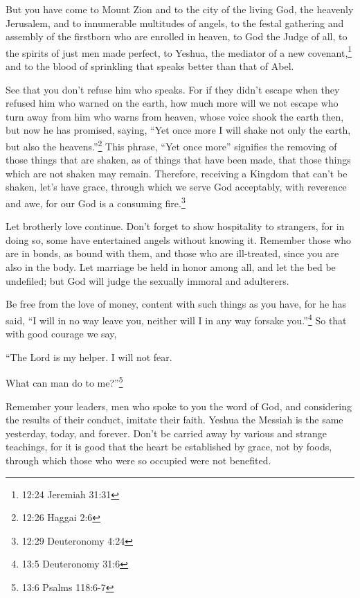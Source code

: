 \myverse{}But you have come to Mount Zion and to the city of the living
God, the heavenly Jerusalem, and to innumerable multitudes of angels,
\myverse{}to the festal gathering and assembly of the firstborn who are enrolled in
heaven, to God the Judge of all, to the spirits of just men made perfect,
\myverse{}to Yeshua, the mediator of a new covenant,\footnote{12:24 Jeremiah 31:31} and to the blood of sprinkling that speaks
better than that of Abel.

\myverse{}See that you don’t refuse him who speaks. For if they didn’t
escape when they refused him who warned on the earth, how much more will we not escape who turn away from
him who warns from heaven,
\myverse{}whose voice shook the earth then, but now he has promised, saying, “Yet once
more I will shake not only the earth, but also the heavens.”\footnote{12:26 Haggai 2:6}
\myverse{}This phrase, “Yet once more” signifies the removing of those things that
are shaken, as of things that have been made, that those things which are not shaken may remain.
\myverse{}Therefore, receiving a Kingdom that can’t be shaken, let’s have grace, through
which we serve God acceptably, with reverence and awe,
\myverse{}for our God is a consuming fire.\footnote{12:29 Deuteronomy 4:24}


\mychapter{} \myverse*{}Let brotherly love continue.
\myverse{}Don’t forget to show hospitality to strangers, for in doing so, some have entertained
angels without knowing it.
\myverse{}Remember those who are in bonds, as bound with them, and those who are ill-treated,
since you are also in the body.
\myverse{}Let marriage be held in honor among all, and let the bed be undefiled; but
God will judge the sexually immoral and adulterers.

\myverse{}Be free from the love of money, content with such things as you
have, for he has said, “I will in no way leave you, neither will I in any way forsake you.”\footnote{13:5 Deuteronomy 31:6}
\myverse{}So that with good courage we say,

“The Lord is my helper. I will not fear.

What can man do to me?”\footnote{13:6 Psalms 118:6-7}

\myverse{}Remember your leaders, men who spoke to you the word of God, and
considering the results of their conduct, imitate their faith.
\myverse{}Yeshua the Messiah is the same yesterday, today, and forever.
\myverse{}Don’t be carried away by various and strange teachings, for it is good that
the heart be established by grace, not by foods, through which those who were so occupied were not benefited.

